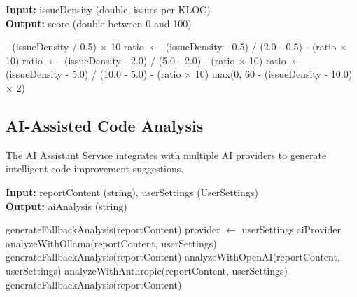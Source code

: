 \documentclass[12pt,a4paper]{article}
\begin{document}
    \begin{algorithm}[H]
        \caption{calculateBaseScore}
        \textbf{Input:} issueDensity (double, issues per KLOC)\\
        \textbf{Output:} score (double between 0 and 100)
        \begin{algorithmic}[1]
                 - (issueDensity / 0.5) $\times$ 10 
            \State ratio $\gets$ (issueDensity - 0.5) / (2.0 - 0.5)
             - (ratio $\times$ 10) 
            \State ratio $\gets$ (issueDensity - 2.0) / (5.0 - 2.0)
             - (ratio $\times$ 10) 
            \State ratio $\gets$ (issueDensity - 5.0) / (10.0 - 5.0)
             - (ratio $\times$ 10) 
            \Else
                \Return max(0, 60 - (issueDensity - 10.0) $\times$ 2) 
            \EndIf
        \end{algorithmic}
    \end{algorithm}

    \subsection{AI-Assisted Code Analysis}

    The AI Assistant Service integrates with multiple AI providers to generate intelligent code improvement suggestions.

    \begin{algorithm}[H]
        \caption{analyzeWithAI}
        \textbf{Input:} reportContent (string), userSettings (UserSettings)\\
        \textbf{Output:} aiAnalysis (string)
        \begin{algorithmic}[1]
                \Return generateFallbackAnalysis(reportContent)
            \EndIf
            \State provider $\gets$ userSettings.aiProvider
                    \Return analyzeWithOllama(reportContent, userSettings)
                \Else
                    \Return generateFallbackAnalysis(reportContent)
                \EndIf
            \Return analyzeWithOpenAI(reportContent, userSettings)
            \Return analyzeWithAnthropic(reportContent, userSettings)
            \Else
                \Return generateFallbackAnalysis(reportContent)
            \EndIf
        \end{algorithmic}
    \end{algorithm}
\end{document}
